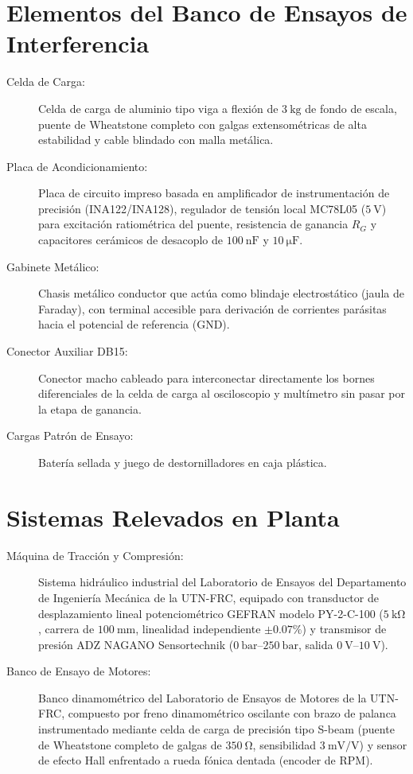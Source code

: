 \section{Elementos del Banco de Ensayos de Interferencia}
\begin{description}
    \item[Celda de Carga:] Celda de carga de aluminio tipo viga a flexión de $\qty{3}{\kilogram}$ de fondo de escala,
    puente de Wheatstone completo con galgas extensométricas de alta estabilidad y cable blindado con malla metálica.
    \item[Placa de Acondicionamiento:] Placa de circuito impreso basada en amplificador de instrumentación
    de precisión (INA122/INA128), regulador de tensión local MC78L05 ($\qty{+5}{\volt}$) para excitación
    ratiométrica del puente, resistencia de ganancia $R_G$ y capacitores cerámicos de desacoplo de
    $\qty{100}{\nano\farad}$ y $\qty{10}{\micro\farad}$.
    \item[Gabinete Metálico:] Chasis metálico conductor que actúa como blindaje electrostático (jaula de Faraday), con
    terminal accesible para derivación de corrientes parásitas hacia el potencial de referencia (GND).
    \item[Conector Auxiliar DB15:] Conector macho cableado para interconectar directamente los bornes diferenciales de
    la celda de carga al osciloscopio y multímetro sin pasar por la etapa de ganancia.
    \item[Cargas Patrón de Ensayo:] Batería sellada y juego de destornilladores en caja plástica.
\end{description}

\section{Sistemas Relevados en Planta}
\begin{description}
    \item[Máquina de Tracción y Compresión:] Sistema hidráulico industrial del Laboratorio de Ensayos del
    Departamento de Ingeniería Mecánica de la UTN-FRC, equipado con transductor de desplazamiento lineal
    potenciométrico GEFRAN modelo PY-2-C-100 ($\qty{5}{\kilo\ohm}$, carrera de $\qty{100}{\milli\meter}$,
    linealidad independiente $\pm 0.07\%$) y transmisor de presión ADZ NAGANO Sensortechnik
    ($\qtyrange{0}{250}{\bar}$, salida $\qtyrange{0}{10}{\volt}$).
    \item[Banco de Ensayo de Motores:] Banco dinamométrico del Laboratorio de Ensayos de Motores de la UTN-FRC,
    compuesto por freno dinamométrico oscilante con brazo de palanca instrumentado mediante celda de carga de
    precisión tipo S-beam (puente de Wheatstone completo de galgas de $\qty{350}{\ohm}$, sensibilidad
    $\qty{3}{\milli\volt\per\volt}$) y sensor de efecto Hall enfrentado a rueda fónica dentada (encoder de RPM).
\end{description}
